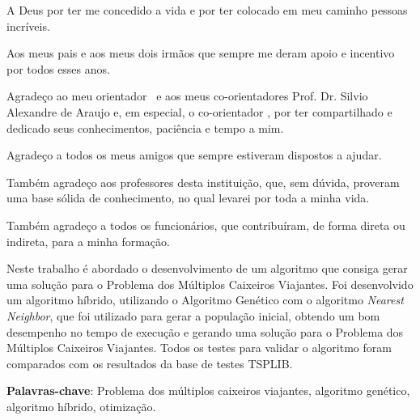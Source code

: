 \documentclass[12pt,openright,a4paper,twoside]{tcc}
\begin{document}

	\imprimircapa
	\imprimirfolhaderosto
	\folhadeaprovacaoteste
    
    \begin{agradecimentos}
        A Deus por ter me concedido a vida e por ter colocado em meu caminho pessoas incríveis.

        Aos meus pais e aos meus dois irmãos que sempre me deram apoio e incentivo por todos esses anos.

        Agradeço ao meu orientador \imprimirorientador~e aos meus co-orientadores Prof. Dr. Silvio Alexandre de Araujo e, em especial, o co-orientador \imprimircoorientador, por ter compartilhado  e dedicado seus conhecimentos, paciência e tempo a mim.

        Agradeço a todos os meus amigos que sempre estiveram dispostos a ajudar.

        Também agradeço aos professores desta instituição, que, sem dúvida, proveram uma base sólida de conhecimento, no qual levarei por toda a minha vida.

        Também agradeço a todos os funcionários, que contribuíram, de forma direta ou indireta, para a minha formação.

    \end{agradecimentos}
    
    \listoffigures*
    \cleardoublepage
	\tableofcontents
   
	\newpage

	\begin{resumo}
        Neste trabalho é abordado o desenvolvimento de um algoritmo que consiga gerar uma solução para o Problema dos Múltiplos Caixeiros Viajantes.
        Foi desenvolvido um algoritmo híbrido, utilizando o Algoritmo Genético com o algoritmo \textit{Nearest Neighbor}, que foi utilizado para gerar a população inicial, obtendo um bom desempenho no tempo de execução e gerando uma solução para o Problema dos Múltiplos Caixeiros Viajantes. Todos os testes para validar o algoritmo foram comparados com os resultados da base de testes TSPLIB.
        
        \vspace{\onelineskip}
        \noindent
        \textbf{Palavras-chave}: Problema dos múltiplos caixeiros viajantes, algoritmo genético,  algoritmo híbrido, otimização.

	\end{resumo}
\end{document}
